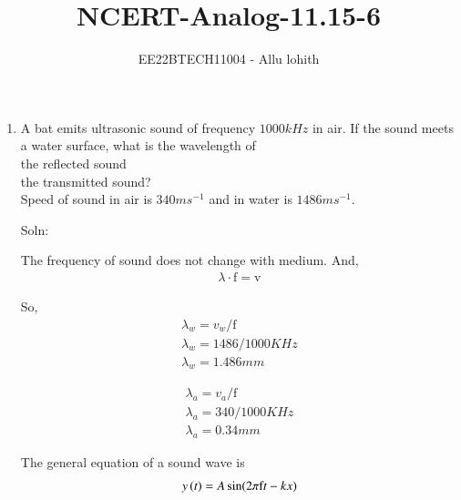 \documentclass[journal,12pt,twocolumn]{IEEEtran}
\theoremstyle{remark}
\begin{document}

\vspace{3cm}

\title{NCERT-Analog-11.15-6}
\author{EE22BTECH11004 - Allu lohith}

\maketitle
\newpage
\bigskip

\renewcommand{\thefigure}{\theenumi}
\renewcommand{\thetable}{\theenumi}
\begin{enumerate}
\item A bat emits ultrasonic sound of frequency $1000 kHz$ in air. If the sound meets a water surface, what is the wavelength of\\[0pt] \brak the reflected sound \\[0pt]
 the transmitted sound?\\
Speed of sound in air is $340 ms^{-1}$ and in water is $1486 ms^{-1}$.\\
\item[Soln:]


\setlength{\intextsep}{2pt}
\begin{table}[h!]
\centering

\vspace{0.5cm}
\caption{\normalsize $Parameters$}
\label{tab:parameters}
\end{table}

The frequency of sound does not change with medium. And,
\begin{align}
{\lambda}\cdot {\text{f}}={\text{v}}
\end{align}

So,
\begin{align}
\lambda_w=v_w/ \text{f}\\
\lambda_w=1486/1000KHz\\
\lambda_w=1.486mm    
\end{align}

\begin{align}
\lambda_a=v_a/\mathrm{f}\\
\lambda_a=340/1000KHz\\
\lambda_a=0.34mm    
\end{align}

The general equation of a sound wave is
\begin{align}
y\left(t\right)=A \sin (2\pi\text{f} t-kx)
\end{align}

\begin{table}[h!]
\centering

\vspace{0.5cm}
\label{tab:Parameters}
\end{table}



\end{enumerate}
\end{document}
